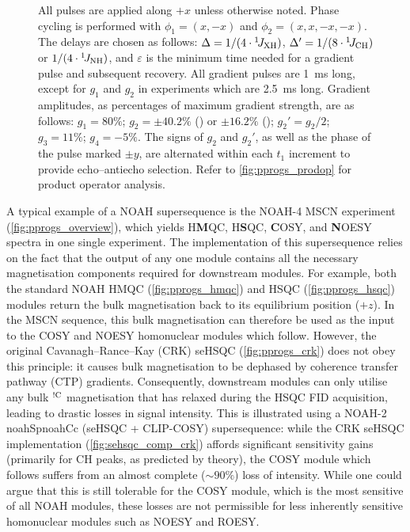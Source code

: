 \documentclass[11pt]{article}
\newcommand*{\noahtwo}[2]{\csname noah#1\endcsname\csname noah#2\endcsname}
\newcommand*{\carbon}{\ce{^{13}C}}
\newcommand*{\nitrogen}{\ce{^{15}N}}
\newcommand*{\onejxh}{{}^{1}\!J_{\ce{XH}}}
\newcommand*{\onejch}{{}^{1}\!J_{\ce{CH}}}
\newcommand*{\onejnh}{{}^{1}\!J_{\ce{NH}}}
\newcommand*{\magnnot}[1]{\ce{^1H}$^{!#1}$}
\begin{document}
\begin{figure}
{        All pulses are applied along $+x$ unless otherwise noted.
        Phase cycling is performed with $\phi_1 = (x, -x)$ and $\phi_2 = (x, x, -x, -x)$.
        The delays are chosen as follows: $\Delta = 1/(4\cdot\onejxh)$, $\Delta' = 1/(8\cdot\onejch)$ or $1/(4\cdot\onejnh)$, and $\varepsilon$ is the minimum time needed for a gradient pulse and subsequent recovery.
        All gradient pulses are \SI{1}{\ms} long, except for $g_1$ and $g_2$ in \nitrogen{} experiments which are \SI{2.5}{\ms} long.
        Gradient amplitudes, as percentages of maximum gradient strength, are as follows: $g_1 = 80\%$; $g_2 = \pm 40.2\%$ (\carbon{}) or $\pm 16.2\%$ (\nitrogen{}); ${g_2}' = g_2/2$; $g_3 = 11\%$; $g_4 = -5\%$.
        The signs of $g_2$ and ${g_2}'$, as well as the phase of the \carbon{} pulse marked $\pm y$, are alternated within each $t_1$ increment to provide echo--antiecho selection.
        Refer to \cref{fig:pprogs_prodop} for product operator analysis.
    }
    \label{fig:pprogs}
\end{figure}

A typical example of a NOAH supersequence is the NOAH-4 MSCN experiment (\cref{fig:pprogs_overview}), which yields \nitrogen{} H\textbf{M}QC, \carbon{} H\textbf{S}QC, \textbf{C}OSY, and \textbf{N}OESY spectra in one single experiment.\autocite{Kupce2017ACIE}
The implementation of this supersequence relies on the fact that the output of any one module contains all the necessary magnetisation components required for downstream modules.
For example, both the standard NOAH HMQC (\cref{fig:pprogs_hmqc}) and HSQC (\cref{fig:pprogs_hsqc}) modules return the bulk magnetisation back to its equilibrium position ($+z$).
In the MSCN sequence, this bulk magnetisation can therefore be used as the input to the COSY and NOESY homonuclear modules which follow.
However, the original Cavanagh--Rance--Kay (CRK) seHSQC (\cref{fig:pprogs_crk}) does not obey this principle: it causes bulk magnetisation to be dephased by coherence transfer pathway (CTP) gradients.
Consequently, downstream modules can only utilise any bulk \magnnot{\ce{C}} magnetisation that has relaxed during the HSQC FID acquisition, leading to drastic losses in signal intensity.
This is illustrated using a NOAH-2 \noahtwo{Sp}{Cc} (seHSQC + CLIP-COSY\autocite{Koos2016ACIE}) supersequence: while the CRK seHSQC implementation (\cref{fig:sehsqc_comp_crk}) affords significant sensitivity gains (primarily for CH peaks, as predicted by theory\autocite{sehsqc_sens}), the COSY module which follows suffers from an almost complete ($\sim 90\%$) loss of intensity.
While one could argue that this is still tolerable for the COSY module, which is the most sensitive of all NOAH modules, these losses are not permissible for less inherently sensitive homonuclear modules such as NOESY and ROESY.
\end{document}
